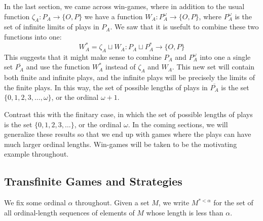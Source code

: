 \documentclass[11pt]{article} %
\theoremstyle{plain} %
\theoremstyle{definition} %
\theoremstyle{note}
\theoremstyle{exercisestyle}
\newcommand*\from{\colon}
\newcommand{\cmap}[3]{#1\from{}#2\to{}#3}
\newcommand{\cprd}{\sqcup}
\newcommand{\OP}{\{O,P\}}
\begin{document}
In the last section, we came across win-games, where in addition to the usual function $\cmap{\zeta_A}{P_A}{\OP}$ we have a function $\cmap{W_A}{P_A^\omega}{\OP}$, where $P_A^\omega$ is the set of infinite limits of plays in $P_A$.  We saw that it is usefult to combine these two functions into one:
\[
  W_A^* = \zeta_A\cprd W_A\from P_A\cprd P_A^*\to\OP
  \]
This suggests that it might make sense to combine $P_A$ and $P_A^\omega$ into one a single set $\overline{P_A}$ and use the function $W_A^*$ instead of $\zeta_A$ and $W_A$.  This new set will contain both finite and infinite plays, and the infinite plays will be precisely the limits of the finite plays.  In this way, the set of possible lengths of plays in $\overline{P_A}$ is the set $\{0,1,2,3,\dots,\omega\}$, or the ordinal $\omega+1$.  

Contrast this with the finitary case, in which the set of possible lengths of plays is the set $\{0,1,2,3,\dots\}$, or the ordinal $\omega$.  In the coming sections, we will generalize these results so that we end up with games where the plays can have much larger ordinal lengths.  Win-games will be taken to be the motivating example throughout.  

\subsection{Transfinite Games and Strategies}

We fix some ordinal $\alpha$ throughout.  Given a set $M$, we write $M^{*<\alpha}$ for the set of all ordinal-length sequences of elements of $M$ whose length is less than $\alpha$.  
\end{document}
